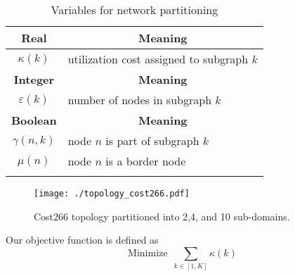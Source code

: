 \documentclass[journal]{IEEEtran}
\begin{document}
\begin{table}[t]\begin{center}\footnotesize
\begin{tabular}{ c l }
\toprule
\textbf{Real} & \multicolumn{1}{c}{\textbf{Meaning}} \\
\midrule
$\kappa(k)$ & utilization cost assigned to subgraph $k$ \\\addlinespace[1.0mm]
\midrule
\textbf{Integer} & \multicolumn{1}{c}{\textbf{Meaning}} \\
\midrule
$\varepsilon(k)$ & number of nodes in subgraph $k$ \\\addlinespace[1.0mm]
\midrule
\textbf{Boolean} & \multicolumn{1}{c}{\textbf{Meaning}} \\
\midrule
$\gamma (n, k)$ & node $n$ is part of subgraph $k$ \\\addlinespace[1.0mm]
$\mu (n)$ & node $n$ is a border node \\\addlinespace[1.0mm]
\bottomrule
\end{tabular}\normalsize
\caption{Variables for network partitioning}\label{partitioning_vars}
\end{center}\end{table}

\begin{figure}[t] \center
\texttt{[image: ./topology\_cost266.pdf]}
\caption{Cost266 topology partitioned into 2,4, and 10 sub-domains.}
\label{cost266} \end{figure}

Our objective function is defined as
\[
\text{Minimize } \, \sum_{k\in[1,K]} \kappa(k)
\]
\end{document}
